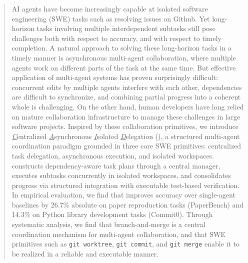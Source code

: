 \begin{abstract}
AI agents have become increasingly capable at isolated software engineering (SWE) tasks such as resolving issues on Github.
Yet long-horizon tasks involving multiple interdependent subtasks still pose challenges both with respect to accuracy, and with respect to timely completion.
A natural approach to solving these long-horizon tasks in a timely manner is asynchronous multi-agent collaboration, where multiple agents work on different parts of the task at the same time.
But effective application of multi-agent systems has proven surprisingly difficult: concurrent edits by multiple agents interfere with each other, dependencies are difficult to synchronize, and combining partial progress into a coherent whole is challenging.
On the other hand, human developers have long relied on mature collaboration infrastructure to manage these challenges in large software projects.
Inspired by these collaboration primitives, we introduce \underline{\textit{C}}entralized \underline{\textit{A}}synchronous \underline{\textit{I}}solated \underline{\textit{D}}elegation (\ourmethod), a structured multi-agent coordination paradigm grounded in three core SWE primitives: centralized task delegation, asynchronous execution, and isolated workspaces. \ourmethod constructs dependency-aware task plans through a central manager, executes subtasks concurrently in isolated workspaces, and consolidates progress via structured integration with executable test-based verification. In empirical evaluation, we find that \ourmethod improves accuracy over single-agent baselines by 26.7\% absolute on paper reproduction tasks (PaperBench) and 14.3\% on Python library development tasks (Commit0).
Through systematic analysis, we find that branch-and-merge is a central coordination mechanism for multi-agent collaboration, and that SWE primitives such as \texttt{git worktree}, \texttt{git commit}, and \texttt{git merge} enable it to be realized in a reliable and executable manner.

\end{abstract}